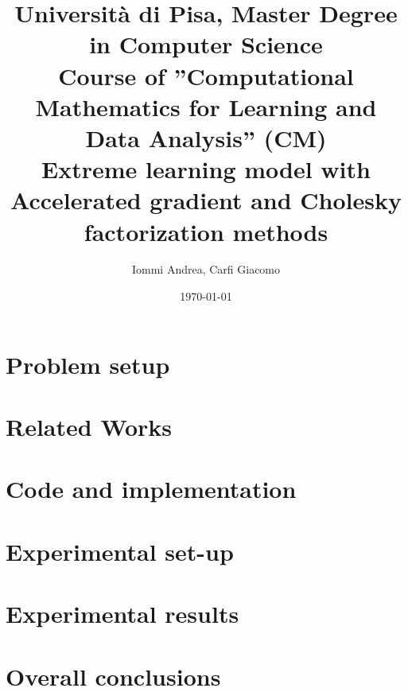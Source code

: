 \documentclass[18p]{article}
\title{{\small Università di Pisa, Master Degree in Computer Science \\ Course of ''Computational Mathematics for Learning and Data Analysis'' (CM)} \\ \vspace{0.7em}
\huge{\textbf{Extreme learning model with Accelerated gradient and Cholesky factorization methods}} \\\vspace{0.9em} }
\author{Iommi Andrea, Carfi Giacomo \\ \vspace{0.7em}
\vspace{0.4em}}
\date{\today}
\begin{document}
    \maketitle

    \vspace{0.3cm}

    \section{Problem setup}
%    

    \section{Related Works}
%    
    
    \section{Code and implementation}
    
    \section{Experimental set-up}
    \section{Experimental results}
    \section{Overall conclusions}
    
    \newpage
    \printbibliography
\end{document}
